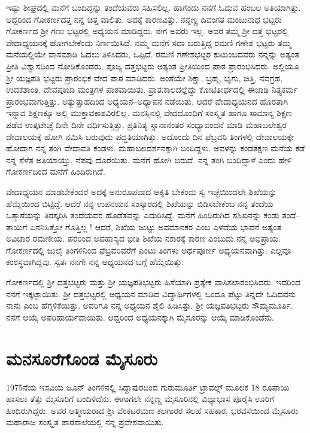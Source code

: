 {ಇಷ್ಟು ಶೀಘ್ರದಲ್ಲಿ ಮನೆಗೆ ಬಂದಿದ್ದನ್ನು ತಂದೆಯವರು ಸಹಿಸಲಿಲ್ಲ. ಹಾಗೆಂದು ನನಗೆ ಓದುವ ಹಂಬಲ ಅತಿಯಾಗಿತ್ತು.  ಆದ್ದರಿಂದ ಗೋಕರ್ಣದತ್ತ ನನ್ನ ಚಿತ್ತ ವಾಲಿತು.  ಅದಕ್ಕೆ ಕಾರಣವಿತ್ತು.  ನನ್ನಣ್ಣ ದಿವಂಗತ ಮಂಜುನಾಥ ಭಟ್ಟರು ಗೋಕರ್ಣದ ಶ್ರೀ ಗಣು ಭಟ್ಟರಲ್ಲಿ ಅಧ್ಯಯನ ಮಾಡಿದ್ದರು. ಈಗ ಅವರು ಇಲ್ಲ.  ಅವರ ತಮ್ಮ ಶ್ರೀ ದತ್ತ ಭಟ್ಟರಲ್ಲಿ ವೇದಾಧ್ಯಯನಕ್ಕೆ ಹೋಗಬೇಕೆಂದು ನಿರ್ಣಯಿಸಿದೆ.  ನಮ್ಮ ಮನೆಗೆ ಸದಾ ಬರುತ್ತಿದ್ದ ರಮಣಿ ಗಣೇಶ ಭಟ್ಟರು ತಮ್ಮ ಮನೆಯಲ್ಲಿಯೇ ವಾಸಮಾಡಿ ಓದಲು ತಿಳಿಸಿದರು,  ಒಪ್ಪಿದೆ.  ರಮಣಿ ಗಣೇಶಭಟ್ಟರ ಕುಟುಂಬದವರು ನನ್ನನ್ನು ಅತ್ಯಂತ ಪ್ರೀತಿ ವಿಶ್ವಾಸದಿಂದ ನೋಡಿಕೊಂಡರು.  ಪೂಜ್ಯ ದತ್ತಭಟ್ಟರು ಅತ್ಯಂತ ಪ್ರೀತಿಯಿಂದ ಪಾಠ ಪ್ರಾರಂಭಿಸಿದರು.  ಅಲ್ಲಿಯೂ ಶ್ರೀ ಯಜ್ಞಪತಿ ಭಟ್ಟರು ಪ್ರಾರಂಭಿಕ ವೇದ ಪಾಠ ಮಾಡಿದರು.  ಅಂತೆಯೇ ಶಿಕ್ಷಾ, ಬ್ರಹ್ಮ, ಭೃಗು, ಚಿತ್ತಿ, ನವಗ್ರಹ, ಉದಕಶಾಂತಿ, ದೇವಪೂಜಾ ಮಂತ್ರಗಳ ಪಾಠವಾಯಿತು.  ಪ್ರಾತಃಕಾಲದಲ್ಲೆದ್ದು ಕೋಟಿತೀರ್ಥದಲ್ಲಿ ಈಜಾಡಿ ನಿತ್ಯಕರ್ಮ ಪ್ರಾರಂಭವಾಗುತ್ತಿತ್ತು.  ಅತ್ಯುತ್ಸಾಹದಿಂದ ಅಧ್ಯಯನ–ಅಧ್ಯಾಪನ ನಡೆಯಿತು.  ಆದರೆ ವೇದಾಧ್ಯಯನದ ಹೊರತಾಗಿ ಇನ್ನಾವ ಶಿಕ್ಷಣಕ್ಕೂ ಅಲ್ಲಿ ಮುಕ್ತಾವಕಾಶವಿರಲಿಲ್ಲ.  ಮನಸ್ಸಿನಲ್ಲಿ ವೇದದೊಂದಿಗೆ ಸಂಸ್ಕೃತ ಹಾಗೂ ಸಾಮಾನ್ಯ ಶಿಕ್ಷಣ ಪಡೆವ ಉತ್ಕಟೇಚ್ಛೆ ದಿನೇ ದಿನೇ ವರ್ಧಿಸುತ್ತಿತ್ತು.  ಪ್ರತಿನಿತ್ಯ ಸ್ನಾನಾನಂತರ ಸಂಧ್ಯಾವಂದನೆ ಮಾಡಿ ಮಹಾಬಲೇಶ್ವರ ದೇವಾಲಯಕ್ಕೆ ಹೋಗಿ ನಮಿಸಿ ಬರುವುದು ಪದ್ಧತಿಯಾಗಿತ್ತು.  ಅದೊಂದು ದಿನ ಫೆಬ್ರವರಿ ತಿಂಗಳಲ್ಲಿ ದೇವಾಲಯಕ್ಕೇ ಹೋದಾಗ ನನ್ನ ತಂಗಿ ವೇದಾವತಿ ಕಂಡಳು.  ಮಹಾಬಲದರ್ಶನಕ್ಕಾಗಿ ಬಂದಿದ್ದಳು.  ಅವಳನ್ನು ಕಂಡತಕ್ಷಣ ಮನೆಯ ಕಡೆ ನನ್ನ ಸೆಳೆತ ಅತಿಯಾಯ್ತು.  ನೆಪವು ದೊರೆಯಿತು.  ಮನೆಗೆ ಹೋಗಿ ಬರುವೆ. ನನ್ನ ತಂಗಿ ಬಂದಿದ್ದಾಳೆ ಎಂದು ಹೇಳಿ ಗೋಕರ್ಣದಿಂದ ಮನೆಗೆ ಹಿಂದಿರುಗಿದೆ.  

ವೇದಾಧ್ಯಯನ ಮಾಡಬೇಕೆಂದರೆ ಅದಕ್ಕೆ ಅನುರೂಪವಾದ ಆಕೃತಿ ಬೇಕೆಂದು ಸ್ವ ಇಚ್ಛೆಯಿಂದಲೇ ಶಿಖೆಯನ್ನು ಹೆಮ್ಮೆಯಿಂದ ಬಿಟ್ಟಿದ್ದೆ.  ಆದರೆ ನನ್ನ ಉಪನಯನ ಸಂಸ್ಕಾರದಲ್ಲಿ ಶಿಖೆಯನ್ನು ಬಿಡಿಸಬೇಕೆಂಬ ನನ್ನ ತಂದೆಯ ಒತ್ತಾಸೆಯನ್ನು ತಿರಸ್ಕರಿಸಿ ತಂದೆಯವರ ಹೊಡೆತವನ್ನು ಎದುರಿಸಿದ್ದೆ.  ಮನೆಗೆ ಹಿಂದಿರುಗಿದ ಸಶಿಖನನ್ನು ಕಂಡು ತಂದೆ–ತಾಯಿಗೆ ಏನನಿಸಿತ್ತೋ ಗೊತ್ತಿಲ್ಲ !  ಆದರೆ, ಶಿಖೆಯ ಜುಟ್ಟು ಅವಮಾನಕರ ಎಂಬ ಎಳವೆಯ ಭಾವನೆ ಅತ್ಯಂತ ಅವಿಚಾರ ರಮಣೀಯ. ಪರರಿಂದ ಅಪಹಾಸ್ಯದ ಭೀತಿ ಶಿಖೆಯ ನಕಾರಕ್ಕೆ ಕಾರಣ ಎಂಬುದು ನನ್ನ ಅಭಿಪ್ರಾಯ.  ಗೋಕರ್ಣದಲ್ಲಿ ಜುಲೈ ತಿಂಗಳಿನಿಂದ ಫೆಬ್ರವರಿವರೆಗೆ ಎಂಟು ತಿಂಗಳು ಅರ್ಥಪೂರ್ಣ ಅಧ್ಯಯನವಾಗಿತ್ತು.  ಎಲ್ಲವೂ ಕಂಠಸ್ಥವಾಗಿದ್ದವು.  ಸ್ವತಃ ನನಗೇ ನನ್ನ ಅಧ್ಯಯನದ ಬಗ್ಗೆ ಹೆಮ್ಮೆಯಿತ್ತು.

ಗೋಕರ್ಣದಲ್ಲಿ ಶ್ರೀ ದತ್ತಭಟ್ಟರು ಮತ್ತು ಶ್ರೀ ಯಜ್ಞಪತಿಭಟ್ಟರು ಹಿಸೆಯಾಗಿ ಪ್ರತ್ಯೇಕ ವಾಸಿಸಲಾರಂಭಿಸಿದರು.  ಇದರಿಂದ ನನಗೆ ಇಕ್ಕಟ್ಟಾಯಿತು. ಶ್ರೀ ದತ್ತಭಟ್ಟರಲ್ಲಿ ಅಧ್ಯಯನ ಮಾಡಿದ ವಿದ್ಯಾರ್ಥಿಗಳಲ್ಲಿ ಒಂದೂ ಪೆಟ್ಟು ತಿನ್ನದೇ ಓದಿದವನು ನಾನು ಎಂಬ ಹೆಗ್ಗಳಿಕೆಯಿತ್ತು.  ಅವರಿಗೂ ನನ್ನ ಅಧ್ಯಯನ ಶೈಲಿ ಹಿಡಿಸಿತ್ತು.  ಶ್ರೀ ಯಜ್ಞಪತಿಭಟ್ಟರು ಸೌಮ್ಯಮೂರ್ತಿ. ನನಗೆ ಆಯ್ಕೆ ಅಪರಿಹಾರ್ಯವಾಯಿತು.  ಆದ್ದರಿಂದ ಅಧ್ಯಯನಕ್ಕಾಗಿ ಮೈಸೂರನ್ನು ಆಯ್ಕೆ ಮಾಡಿಕೊಂಡೆನು.

\section*{ಮನಸೂರೆಗೊಂಡ ಮೈಸೂರು}

1975ನೆಯ ಇಸವಿಯ ಜೂನ್ ತಿಂಗಳಿನಲ್ಲಿ ಸಿದ್ದಾಪುರದಿಂದ ಗುರುಮೂರ್ತಿ ಟ್ರಾವಲ್ಸ್ ಮೂಲಕ 18 ರೂಪಾಯಿ ಹಾಸಲು ತೆತ್ತು ಮೈಸೂರಿಗೆ ಬಂದಿಳಿದೆನು. ಈಗಾಗಲೇ ನನ್ನಣ್ಣ ಮೈಸೂರಿನಲ್ಲಿ ವಿಧ್ಯಾಭಾಸ ಪೂರೈಸಿ ಊರಿಗೆ ಹಿಂದಿರುಗಿದ್ದರು.  ಅವರ ಆತ್ಮೀಯರಾದ ಶ್ರೀ ವೆಂಕಟರಮಣ ಕಲಗಾರರ ಸಲಹೆ ಸಹಕಾರ, ಭರವಸೆಯಿಂದ ಮೈಸೂರು ಮಹಾರಾಜ ಸಂಸ್ಕೃತ ಪಾಠಶಾಲೆಯಲ್ಲಿ ನನ್ನ ಪ್ರವೇಶವಾಯಿತು.

}
